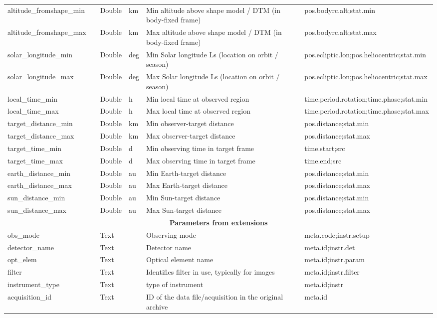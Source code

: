 \documentclass[11pt,a4paper]{ivoa}
\begin{document}
\begin{longtable}{p{3.5cm}p{0.5cm}p{1cm}p{1cm}p{7cm}p{3cm}}
altitude\_fromshape\_min&&Double&km&Min altitude above shape model / DTM (in body-fixed frame)&pos.bodyrc.alt;stat.min\\
altitude\_fromshape\_max&&Double&km&Max altitude above shape model / DTM (in body-fixed frame)&pos.bodyrc.alt;stat.max\\
solar\_longitude\_min&&Double&deg&Min Solar longitude Ls (location on orbit / season)&pos.ecliptic.lon;pos.heliocentric;stat.min  \\
solar\_longitude\_max&&Double&deg&Max Solar longitude Ls (location on orbit / season)&pos.ecliptic.lon;pos.heliocentric;stat.max \\
local\_time\_min&&Double&h&Min local time at observed region&time.period.rotation;time.phase;stat.min\\
local\_time\_max&&Double&h&Max local time at observed region&time.period.rotation;time.phase;stat.max \\
target\_distance\_min&&Double&km&Min observer-target distance&pos.distance;stat.min\\
target\_distance\_max&&Double&km&Max observer-target distance&pos.distance;stat.max\\
target\_time\_min&&Double&d&Min observing time in target frame&time.start;src\\
target\_time\_max&&Double&d&Max observing time in target frame&time.end;src\\
earth\_distance\_min&&Double&au&Min Earth-target distance&pos.distance;stat.min\\
earth\_distance\_max&&Double&au&Max Earth-target distance&pos.distance;stat.max\\
sun\_distance\_min&&Double&au&Min Sun-target distance&pos.distance;stat.min\\
sun\_distance\_max&&Double&au&Max Sun-target distance&pos.distance;stat.max\\
\multicolumn{6}{c}{\vrule width 0pt height 20pt depth 12pt \textbf{\textbf{Parameters from extensions}}}\\
obs\_mode&&Text&&Observing mode&meta.code;instr.setup\\
detector\_name&&Text&&Detector name&meta.id;instr.det\\
opt\_elem&&Text&&Optical element name&meta.id;instr.param\\
filter&&Text& &Identifies filter in use, typically for images&meta.id;instr.filter\\
instrument\_type&&Text&&type of instrument&meta.id;instr\\
acquisition\_id&&Text&&ID of the data file/acquisition in the original archive&meta.id\\

\end{longtable}
\end{document}
